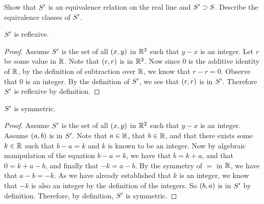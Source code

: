 \documentclass[main.tex]{subfiles}
\begin{document}
\subproblem{}\label{s03p05a}

Show that \({S'}\) is an equivalence relation on the real line and
\({S'} \supset {S}\). Describe the equivalence classes of
\({S'}\).

\begin{thm}
	\({S'}\) is reflexive.
\end{thm}
\begin{proof}
	Assume \({S'}\) is the set of all \(({x},{y})\) in
	\(\mathbb{R} ^ 2\) such that \(y - x\) is an integer. Let \(r\) be some
	value in \(\mathbb{R}\). Note that \(({r},{r})\) is in \(\mathbb{R} ^2\).
	Now since \(0\) is the additive identity of \(\mathbb{R}\), by the
	definition of subtraction over \(\mathbb{R}\), we know that \(r - r = 0\).
	Observe that \(0\) is an integer. By the definition of \({S'}\),
	we see that \(({r},{r})\) is in \({S'}\). Therefore
	\({S'}\) is reflexive by definition.
\end{proof}

\begin{thm}
	\({S'}\) is symmetric.
\end{thm}
\begin{proof}
	Assume \({S'}\) is the set of all \(({x},{y})\) in
	\(\mathbb{R} ^ 2\) such that \(y - x\) is an integer. Assume
	\(({a},{b})\) is in \({S'}\). Note that \(a \in \mathbb{R}\),
	that \(b \in \mathbb{R}\), and that there exists some \(k \in \mathbb{R}\)
	such that \(b - a = k\) and \(k\) is known to be an integer. Now by
	algebraic manipulation of the equation \(b - a = k\), we have that
	\(b = k + a\), and that \(0 = k + a - b\), and finally that
	\(-k = a - b\). By the symmetry of \(=\) in \(\mathbb{R}\), we have that
	\(a - b = -k\). As we have already established that \(k\) is an integer,
	we know that \(-k\) is also an integer by the definition of the
	integers. So \(({b},{a})\) is in \({S'}\) by definition.
	Therefore, by definition, \({S'}\) is symmetric.
\end{proof}
\end{document}
